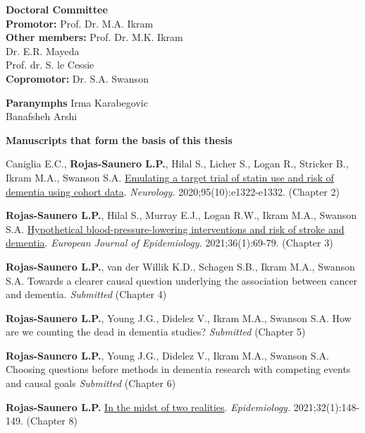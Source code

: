 
 

\newpage
\begin{flushleft}
\textbf{\large{Doctoral Committee}}\\
\vspace{10mm}
\textbf{Promotor:} \hspace{5.5mm} Prof. Dr. M.A. Ikram \\
\vspace{10mm}
\textbf{Other members:} Prof. Dr. M.K. Ikram \\
\hspace{27mm} Dr. E.R. Mayeda \\
\hspace{27mm} Prof. dr. S. le Cessie\\
\vspace{10mm}
\textbf{Copromotor:} \hspace{3mm} Dr. S.A. Swanson\\
\end{flushleft}
\vspace*{\fill}



\vspace*{\fill}
 
\textbf{Paranymphs }    Irma Karabegovic   \\ 
\phantom{Paranymphs ab} Banafsheh Arshi    
                    
\newpage  
\thispagestyle{empty}
\textbf{Manuscripts that form the basis of this thesis}

Caniglia E.C., \textbf{Rojas-Saunero L.P.}, Hilal S., Licher S., Logan
R., Stricker B., Ikram M.A., Swanson S.A.
\href{https://pubmed.ncbi.nlm.nih.gov/32753444/}{Emulating a target
trial of statin use and risk of dementia using cohort data}.
\emph{Neurology.} 2020;95(10):e1322-e1332. (Chapter 2)

\textbf{Rojas-Saunero L.P.}, Hilal S., Murray E.J., Logan R.W., Ikram
M.A., Swanson S.A.
\href{https://pubmed.ncbi.nlm.nih.gov/33247419/}{Hypothetical
blood-pressure-lowering interventions and risk of stroke and dementia}.
\emph{European Journal of Epidemiology.} 2021;36(1):69-79. (Chapter 3)

\textbf{Rojas-Saunero L.P.}, van der Willik K.D., Schagen S.B., Ikram
M.A., Swanson S.A. Towards a clearer causal question underlying the
association between cancer and dementia. \emph{Submitted} (Chapter 4)

\textbf{Rojas-Saunero L.P.}, Young J.G., Didelez V., Ikram M.A., Swanson
S.A. How are we counting the dead in dementia studies? \emph{Submitted}
(Chapter 5)

\textbf{Rojas-Saunero L.P.}, Young J.G., Didelez V., Ikram M.A., Swanson
S.A. Choosing questions before methods in dementia research with
competing events and causal goals \emph{Submitted} (Chapter 6)

\textbf{Rojas-Saunero L.P.}
\href{https://pubmed.ncbi.nlm.nih.gov/33122553/}{In the midst of two
realities}. \emph{Epidemiology.} 2021;32(1):148-149. (Chapter 8)

\newpage
\thispagestyle{empty}
\tableofcontents
